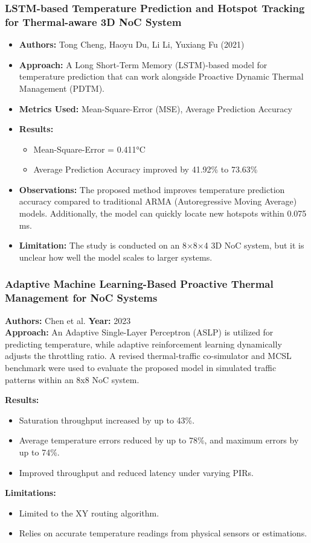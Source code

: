 \documentclass{beamer}
\begin{document}
\begin{frame}
\frametitle{LSTM-based Temperature Prediction and Hotspot Tracking for Thermal-aware 3D NoC System}

\begin{itemize}
    \item \textbf{Authors:} Tong Cheng, Haoyu Du, Li Li, Yuxiang Fu (2021)  
    \item \textbf{Approach:} A Long Short-Term Memory (LSTM)-based model for temperature prediction that can work alongside Proactive Dynamic Thermal Management (PDTM).  
    \item \textbf{Metrics Used:} Mean-Square-Error (MSE), Average Prediction Accuracy  
    \item \textbf{Results:} 
    \begin{itemize}
        \item Mean-Square-Error = 0.411°C  
        \item Average Prediction Accuracy improved by 41.92\% to 73.63\%  
    \end{itemize}
    \item \textbf{Observations:} The proposed method improves temperature prediction accuracy compared to traditional ARMA (Autoregressive Moving Average) models. Additionally, the model can quickly locate new hotspots within 0.075 ms.  
    \item \textbf{Limitation:} The study is conducted on an 8×8×4 3D NoC system, but it is unclear how well the model scales to larger systems.
\end{itemize}

\end{frame}

\begin{frame}
\frametitle{Adaptive Machine Learning-Based Proactive Thermal Management for NoC Systems}

\textbf{Authors:} Chen et al.
\textbf{Year:} 2023 \\[10pt]

\textbf{Approach:}
An Adaptive Single-Layer Perceptron (ASLP) is utilized for predicting temperature, while adaptive reinforcement learning dynamically adjusts the throttling ratio. A revised thermal-traffic co-simulator and MCSL benchmark were used to evaluate the proposed model in simulated traffic patterns within an 8x8 NoC system.  

\textbf{Results:}
\begin{itemize}
\item Saturation throughput increased by up to 43\%.
\item Average temperature errors reduced by up to 78\%, and maximum errors by up to 74\%.
\item Improved throughput and reduced latency under varying PIRs.
\end{itemize}

\textbf{Limitations:}
\begin{itemize}
\item Limited to the XY routing algorithm.
\item Relies on accurate temperature readings from physical sensors or estimations.
\end{itemize}
\end{frame}
\end{document}
